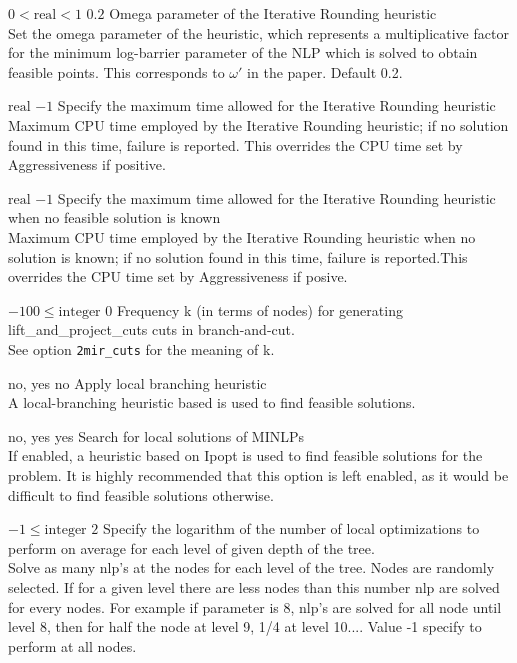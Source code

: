 %
{$0<\textrm{real}<1$}%
{$0.2$}%
{Omega parameter of the Iterative Rounding heuristic\\
Set the omega parameter of the heuristic, which represents a multiplicative factor for the minimum log-barrier parameter of the NLP which is solved to obtain feasible points. This corresponds to $\omega'$ in the paper. Default 0.2.}%
{}

%
{$\textrm{real}$}%
{$-1$}%
{Specify the maximum time allowed for the Iterative Rounding heuristic\\
Maximum CPU time employed by the Iterative Rounding heuristic; if no solution found in this time, failure is reported. This overrides the CPU time set by Aggressiveness if positive.}%
{}

%
{$\textrm{real}$}%
{$-1$}%
{Specify the maximum time allowed for the Iterative Rounding heuristic when no feasible solution is known\\
Maximum CPU time employed by the Iterative Rounding heuristic when no solution is known; if no solution found in this time, failure is reported.This overrides the CPU time set by Aggressiveness if  posive.}%
{}

%
{$-100\leq\textrm{integer}$}%
{$0$}%
{Frequency k (in terms of nodes) for generating lift\_and\_project\_cuts cuts in branch-and-cut.\\
See option \texttt{2mir\_cuts} for the meaning of k.}%
{}

%
{\ttfamily no, yes}%
{no}%
{Apply local branching heuristic\\
A local-branching heuristic based is used to find feasible solutions.}%
{}

%
{\ttfamily no, yes}%
{yes}%
{Search for local solutions of MINLPs\\
If enabled, a heuristic based on Ipopt is used to find feasible solutions for the problem. It is highly recommended that this option is left enabled, as it would be difficult to find feasible solutions otherwise.}%
{}

%
{$-1\leq\textrm{integer}$}%
{$2$}%
{Specify the logarithm of the number of local optimizations to perform on average for each level of given depth of the tree.\\
Solve as many nlp's at the nodes for each level of the tree. Nodes are randomly selected. If for a given level there are less nodes than this number nlp are solved for every nodes. For example if parameter is 8, nlp's are solved for all node until level 8, then for half the node at level 9, 1/4 at level 10.... Value -1 specify to perform at all nodes.}%
{}

